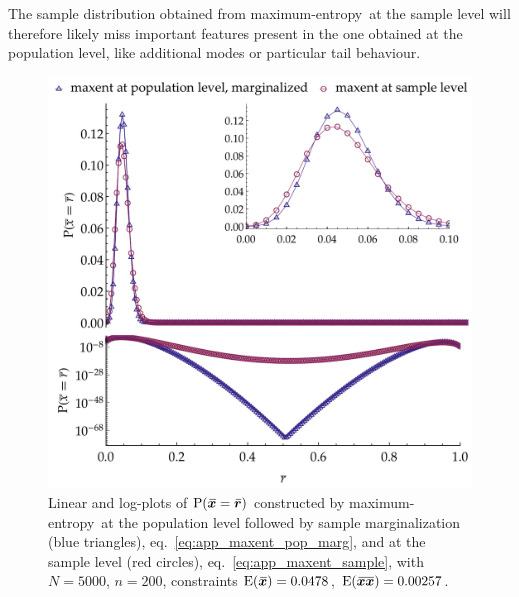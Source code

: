 \documentclass{article}
\theoremstyle{remark}
\theoremstyle{innote}
\renewcommand*{\|}{\mathpunct{|}}%
\newcommand*{\p}{\mathrm{P}}%
\newcommand*{\eqn}{eq.}%
\newcommand*{\E}{\mathrm{E}}
\DeclarePairedDelimiter\expp{(}{)}
\newcommand*{\expe}{\E\expp}%
\theoremstyle{simple}
\newcommand*{\widebar}[1]{{\mkern1.5mu\skew{2}\overline{\mkern-1.5mu#1\mkern-1.5mu}\mkern 1.5mu}}
\newcommand*{\sav}{\widebar} %
\newcommand*{\yxx}{x}%
\newcommand*{\yx}{\bm{\yxx}}%
\newcommand*{\yxs}{\sav{\yx}}%
\newcommand*{\yxxs}{\sav{\yx\yx}}%
\newcommand*{\yr}{\bm{r}}%
\newcommand*{\yrs}{\sav{\yr}}%
\newcommand*{\me}{maximum-entropy}
\begin{document}
The sample distribution obtained from \me\ at the sample level will
therefore likely miss important features present in the one obtained at the
population level, like additional modes or particular tail behaviour.


\begin{figure}[!t]
\centering
\includegraphics[width=0.99\linewidth]{different_maxent_pop_sample_200_realdata_2mom.pdf}%
\caption{Linear and log-plots of $\p(\yxs = \yrs)$ constructed by \me\ at the population
  level followed by sample marginalization (blue triangles),
  \eqn~\eqref{eq:app_maxent_pop_marg}, and at the sample level (red
  circles), \eqn~\eqref{eq:app_maxent_sample}, with $N=5000$,
  $n=200$, constraints $\expe{\yxs}=0.0478$, $\expe{\yxxs}=0.00257$.}
\label{fig:diff_maxent_pop_sample}
\end{figure}%
\end{document}
